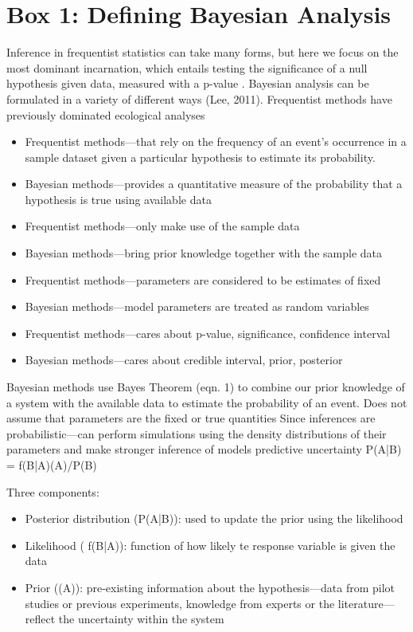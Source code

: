 \documentclass{article}
\begin{document}
\par 
\section* {Box 1: Defining Bayesian Analysis}
Inference in frequentist statistics can take many forms, but here we focus on the most dominant incarnation, which entails testing the significance of a null hypothesis given data, measured with a p-value \citep{Zyl2018}. Bayesian analysis can be formulated in a variety of different ways (Lee, 2011). Frequentist methods have previously dominated ecological analyses
\begin{itemize}

\item Frequentist methods—that rely on the frequency of an event's occurrence in a sample dataset given a particular hypothesis to estimate its probability.
\item Bayesian methods—provides a quantitative measure of the probability that a hypothesis is true using available data
\item Frequentist methods—only make use of the sample data
\item Bayesian methods—bring prior knowledge together with the sample data
\item Frequentist methods—parameters  are considered to be estimates of fixed
\item Bayesian methods—model parameters are treated as random variables
\item Frequentist methods—cares about p-value, significance, confidence interval
\item Bayesian methods—cares about credible interval, prior, posterior
\end{itemize}
Bayesian methods use Bayes Theorem (eqn. 1) to combine our prior knowledge of a system with the available data to estimate the probability of an event. 
Does not assume that parameters are the fixed or true quantities
Since inferences are probabilistic—can perform simulations using the density distributions of their parameters and make stronger inference of models predictive uncertainty
P(A|B) = f(B|A)(A)/P(B)
\par Three components:
\begin{itemize}
\item Posterior distribution (P(A|B)): used to update the prior using the likelihood
\item Likelihood ( f(B|A)): function of how likely te response variable is given the data
\item Prior ((A)): pre-existing information about the hypothesis—data from pilot studies or previous experiments, knowledge from experts or the literature—reflect the uncertainty within the system
\end{itemize}
\end{document}
